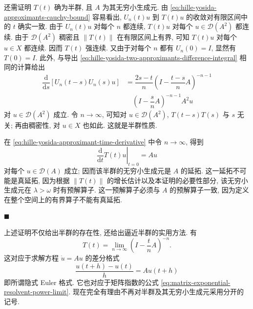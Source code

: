 还需证明 $T(t)$ 确为半群, 且 $A$ 为其无穷小生成元. 由 \eqref{eq:hille-yosida-approximants-cauchy-bound} 容易看出, $U_n(t)u$ 到 $T(t)u$ 的收敛对有限区间中的 $t$ 确实一致. 由于 $U_n(t)u$ 对每个 $n$ 都连续, $T(t)u$ 对每个 $u\in\mathcal{D}(A^2)$ 都连续. 由于 $\mathcal{D}(A^2)$ 稠密且 $\|T(t)\|$ 在有限区间上有界, 可知 $T(t)u$ 对每个 $u\in X$ 都连续. 因而 $T(t)$ 强连续. 又由于对每个 $n$ 都有 $U_n(0)=I$, 显然有 $T(0)=I$. 此外, 与导出 \eqref{eq:hille-yosida-two-approximants-difference-integral} 相同的计算给出
\begin{equation}\label{eq:hille-yosida-semigroup-composition-derivative-bound}
\begin{aligned}\dfrac{\mathrm{d}}{\mathrm{d}s}[U_n(t-s)U_n(s)u]&=\dfrac{2s-t}{n}\left(I-\dfrac{t-s}{n}A\right)^{-n-1}\\&\quad\left(I-\dfrac{s}{n}A\right)^{-n-1}A^2u\end{aligned}
\end{equation}
对 $u\in\mathcal{D}(A^2)$ 成立. 令 $n\to\infty$, 可知对 $u\in\mathcal{D}(A^2)$, $T(t-s)T(s)$ 与 $s$ 无关; 再由稠密性, 对 $u\in X$ 也如此. 这就是半群性质.

\begingroup
\renewenvironment{Proof}{\par}{\par\nobreak\hfill$\blacksquare$\par\vspace{0.1cm}}
\begin{Proof}
在 \eqref{eq:hille-yosida-approximant-time-derivative} 中令 $n\to\infty$, 得到
\begin{equation}\label{eq:hille-yosida-limit-generator-initial-derivative}
\left.\dfrac{\mathrm{d}}{\mathrm{d}t}T(t)u\right|_{t=0}=Au
\end{equation}
对每个 $u\in\mathcal{D}(A)$ 成立; 因而该半群的无穷小生成元是 $A$ 的延拓. 这一延拓不可能是真延拓, 因为根据 $\|T(t)\|$ 的增长估计以及本证明的必要性部分, 该无穷小生成元在 $\lambda>\omega$ 时有预解算子. 这一预解算子必须与 $A$ 的预解算子一致, 因为定义在整个空间上的有界算子不能有真延拓.
\end{Proof}
\endgroup

上述证明不仅给出半群的存在性, 还给出逼近半群的实用方法. 有
\begin{equation}\label{eq:semigroup-implicit-resolvent-approximation-formula}
T(t)=\lim_{n\to\infty}\left(I-\dfrac{t}{n}A\right)^{-n}.
\end{equation}
这对应于求解方程 $\dot u=Au$ 的差分格式
\begin{equation}\label{eq:semigroup-implicit-euler-difference-scheme}
\dfrac{u(t+h)-u(t)}{h}=Au(t+h)
\end{equation}
即所谓隐式 Euler 格式. 它也对应于矩阵指数的公式 \eqref{eq:matrix-exponential-resolvent-power-limit}. 现在完全有理由不再对半群及其无穷小生成元采用分开的记号.

